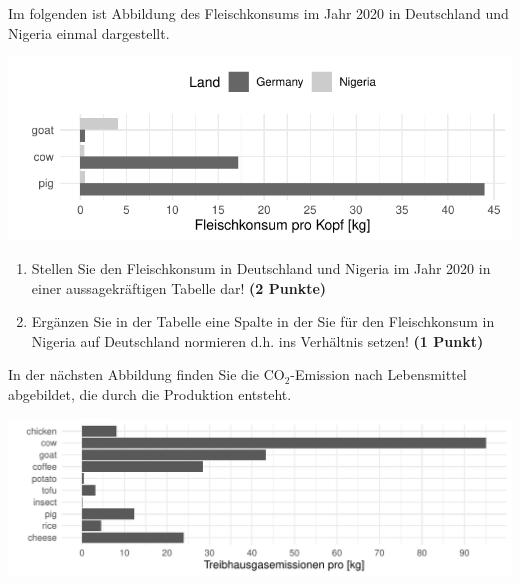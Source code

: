 \documentclass[a4paper, 9pt]{scrartcl}\usepackage[]{graphicx}\usepackage[]{xcolor}
\makeatletter
\def\maxwidth{ %
  \ifdim\Gin@nat@width>\linewidth
    \linewidth
  \else
    \Gin@nat@width
  \fi
}
\newenvironment{knitrout}{}{} %
\makeatother
\begin{document}
Im folgenden ist Abbildung des Fleischkonsums im Jahr 2020 in
Deutschland und Nigeria einmal dargestellt. 

\begin{knitrout}
\color{fgcolor}

{\centering \includegraphics[width=\maxwidth]{img/math-14-a-1} 

}


\end{knitrout}
  
\begin{enumerate}
\item Stellen Sie den Fleischkonsum in Deutschland und Nigeria im Jahr
  2020 in einer aussagekr{\"a}ftigen Tabelle dar! 
  \textbf{(2 Punkte)}
\item Erg{\"a}nzen Sie in der Tabelle eine Spalte in der Sie f{\"u}r den
  Fleischkonsum in Nigeria auf Deutschland normieren d.h. ins Verh{\"a}ltnis
  setzen! \textbf{(1 Punkt)}
\end{enumerate}

In der n{\"a}chsten Abbildung finden Sie die CO$_2$-Emission nach Lebensmittel
abgebildet, die durch die Produktion entsteht.

\begin{knitrout}
\color{fgcolor}

{\centering \includegraphics[width=\maxwidth]{img/math-14-b-1} 

}


\end{knitrout}
\end{document}
